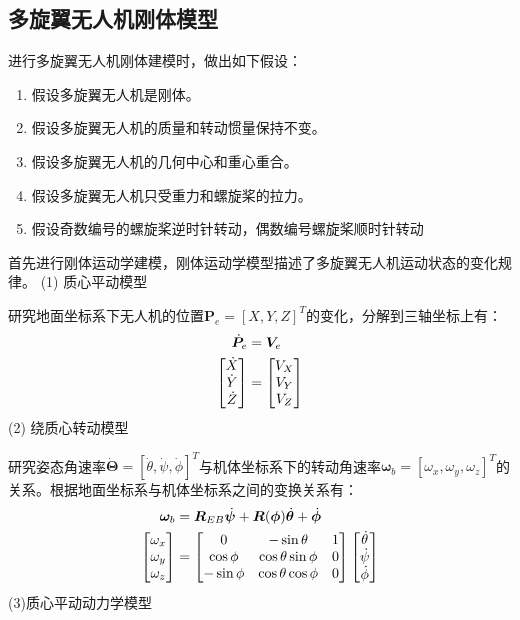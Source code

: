 \subsection{多旋翼无人机刚体模型}
进行多旋翼无人机刚体建模时，做出如下假设\upcite{[2.3]}：
\begin{enumerate}  [itemindent=1em,label={(\arabic*)}]
\item 假设多旋翼无人机是刚体。
\item 假设多旋翼无人机的质量和转动惯量保持不变。
\item 假设多旋翼无人机的几何中心和重心重合。
\item 假设多旋翼无人机只受重力和螺旋桨的拉力。
\item 假设奇数编号的螺旋桨逆时针转动，偶数编号螺旋桨顺时针转动
\end{enumerate}
首先进行刚体运动学建模，刚体运动学模型描述了多旋翼无人机运动状态的变化规律。\newpage
\noindent (1) 质心平动模型

研究地面坐标系下无人机的位置$\boldsymbol{P}_e = [X,Y,Z]^T$的变化，分解到三轴坐标上有：
\begin{equation}
\label{equ2.2}
\begin{aligned}
\dot{\boldsymbol{P}}_e &= \boldsymbol{V}_e \\
\begin{bmatrix}
\dot{X} \cr \dot{Y} \cr \dot{Z} \cr
\end{bmatrix}
&=
\begin{bmatrix}
V_X \cr V_Y \cr V_Z \cr
\end{bmatrix}
\end{aligned}
\end{equation}
(2) 绕质心转动模型

研究姿态角速率$\dot{\boldsymbol{\Theta}}=[\dot{\theta},\dot{\psi},\dot{\phi}]^T$与机体坐标系下的转动角速率$\boldsymbol{\omega}_b=[\omega_x , \omega_y , \omega_z]^T$的关系。根据地面坐标系与机体坐标系之间的变换关系有：
\begin{equation}
\label{equ2.3}
\begin{aligned}
\boldsymbol{\omega}_b & = \boldsymbol{R}_{EB} \dot{\boldsymbol{\psi}}+\boldsymbol{R}(\boldsymbol{\phi}) \dot{\boldsymbol{\theta}}+ \dot{\boldsymbol{\phi}} 
\\
\begin{bmatrix}
\omega_x \cr \omega_y \cr \omega_z \cr
\end{bmatrix}
& =
\begin{bmatrix}
0 & -\sin \theta & 1 \cr
\cos \phi & \cos \theta \sin \phi & 0 \cr
-\sin \phi & \cos \theta \cos \phi & 0 \cr
\end{bmatrix}
\begin{bmatrix}
\dot{\theta} \cr \dot{\psi}  \cr  \dot{\phi} \cr
\end{bmatrix}
\end{aligned}
\end{equation}
(3)质心平动动力学模型

